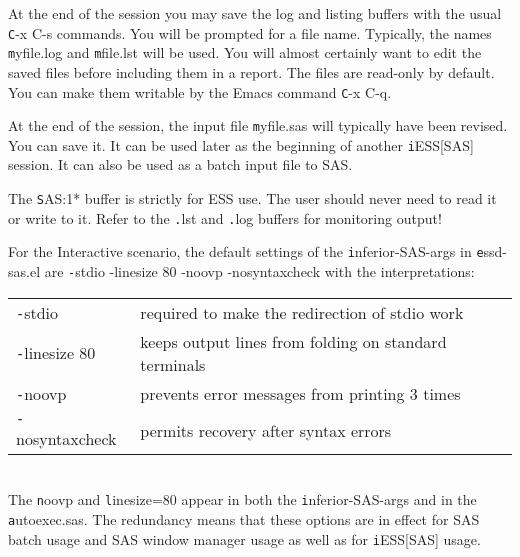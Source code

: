 \documentclass{article}
\begin{document}
 At the end of the session you may save the log and listing
 buffers with the usual {\texttt C-x C-s} commands.  You will be prompted
 for a file name.  Typically, the names {\texttt myfile.log} and {\texttt mfile.lst}
 will be used.  You will almost certainly want to edit the saved
 files before including them in a report.  The files are
 read-only by default.  You can make them writable by the Emacs
 command {\texttt C-x C-q}.

 At the end of the session, the input file {\texttt myfile.sas} will
 typically have been revised.  You can save it.  It can be used
 later as the beginning of another {\texttt iESS[SAS]} session.  It can
 also be used as a batch input file to SAS.
 
 The {\texttt *SAS:1*} buffer is strictly for ESS use.  The user
 should never need to read it or write to it.  Refer to the {\texttt
   .lst} and {\texttt .log} buffers for monitoring output!




For the Interactive scenario,
the default settings of the {\texttt inferior-SAS-args} in {\texttt essd-sas.el}
are {\texttt -stdio -linesize 80 -noovp -nosyntaxcheck}
with the interpretations:\\
\begin{tabular}{ll}
\texttt  -stdio          &required to make the redirection of stdio work       \\
\texttt  -linesize 80    &keeps output lines from folding on standard terminals\\
\texttt  -noovp          &prevents error messages from printing 3 times        \\
\texttt  -nosyntaxcheck  &permits recovery after syntax errors                 \\
\end{tabular}\\
The {\texttt noovp} and {\texttt linesize=80} appear in both the
{\texttt inferior-SAS-args} and in the {\texttt autoexec.sas}.  The
redundancy means that these options are in effect for SAS batch usage
and SAS window manager usage as well as for {\texttt iESS[SAS]} usage.
\end{document}
